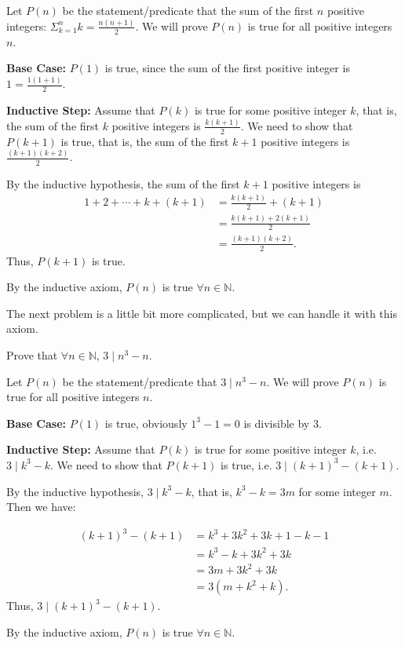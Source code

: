 \documentclass{Math_Note}
\begin{document}
\begin{sol}
    Let $P(n)$ be the statement/predicate that the sum of the first $n$ positive integers: $\Sigma_{k=1}^{n} k=\frac{n(n+1)}{2}$. We will prove $P(n)$ is true for all positive integers $n$.

    \textbf{Base Case:} $P(1)$ is true, since the sum of the first positive integer is $1 = \frac{1(1+1)}{2}$.

    \textbf{Inductive Step:} Assume that $P(k)$ is true for some positive integer $k$, that is, the sum of the first $k$ positive integers is $\frac{k(k+1)}{2}$. We need to show that $P(k+1)$ is true, that is, the sum of the first $k+1$ positive integers is $\frac{(k+1)(k+2)}{2}$.

    By the inductive hypothesis, the sum of the first $k+1$ positive integers is 
    \begin{align*}
        1+2+\cdots+k+(k+1) &= \frac{k(k+1)}{2} + (k+1)\\
        &= \frac{k(k+1)+2(k+1)}{2}\\
        &= \frac{(k+1)(k+2)}{2}.
    \end{align*}
    Thus, $P(k+1)$ is true.

    By the inductive axiom, $P(n)$ is true $\forall n \in \mathbb{N}$.
\end{sol}

The next problem is a little bit more complicated, but we can handle it with this axiom.

\begin{prb}
    Prove that $\forall n \in \mathbb{N}$, $3 \mid n^{3}-n$.
\end{prb}

\begin{sol}
    Let $P(n)$ be the statement/predicate that $3 \mid n^{3}-n$. We will prove $P(n)$ is true for all positive integers $n$.

    \textbf{Base Case:} $P(1)$ is true, obviously $1^{3}-1=0$ is divisible by 3.

    \textbf{Inductive Step:} Assume that $P(k)$ is true for some positive integer $k$, i.e. $3 \mid k^{3}-k$. We need to show that $P(k+1)$ is true, i.e. $3 \mid (k+1)^{3}-(k+1)$.

    By the inductive hypothesis, $3 \mid k^{3}-k$, that is, $k^{3}-k=3m$ for some integer $m$. Then we have: 

    \begin{align*}
        (k+1)^{3}-(k+1) &= k^{3}+3k^{2}+3k+1-k-1\\
        &= k^{3}-k+3k^{2}+3k\\
        &= 3m+3k^{2}+3k\\
        &= 3(m+k^{2}+k).
    \end{align*}
    Thus, $3 \mid (k+1)^{3}-(k+1)$.

    By the inductive axiom, $P(n)$ is true $\forall n \in \mathbb{N}$.
\end{sol}
\end{document}
